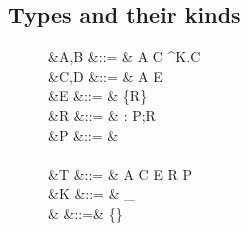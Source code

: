 \documentclass[12pt,phd,lfcs,twoside,openright,logo,leftchapter,normalheadings]{infthesis}
\theoremstyle{plain}
\theoremstyle{definition}
\begin{document}
\subsection{Types and their kinds}
\label{sec:base-language-types}
%
\begin{figure}
\begin{syntax}
    &A,B \in \ValTypeCat  &::= & A \to C
                             \mid  \forall \alpha^K.C
                             \mid   {} \mid [R]
                             \mid  \alpha \\
                      &C,D \in \CompTypeCat   &::= & A \eff E \\
   &E \in \EffectCat   &::= & \{R\}\\
      &R \in \RowCat      &::= & \ell : P;R \mid \rho \mid \cdot \\
 &P \in \PresenceCat  &::= &  \mid \Abs \mid \theta\\
\\
          &T \in \TypeCat    &::= & A \mid C \mid E \mid R \mid P \\
          &K \in \KindCat    &::= & \Type \mid \Comp \mid \Effect \mid \Row_ \mid \Presence \\
     & \in \LabelCat &::=& \emptyset \mid \{\ell\} \uplus {}\\\\


\end{syntax}
\end{figure}
\end{document}

